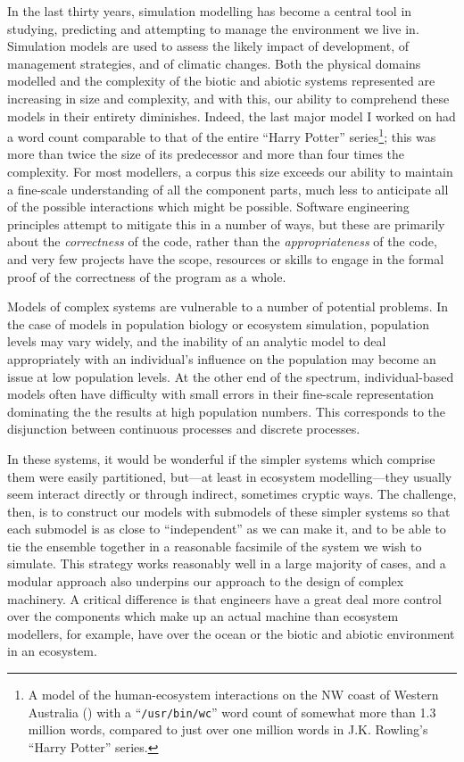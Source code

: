 In the last thirty years, simulation modelling has become a central
tool in studying, predicting and attempting to manage the environment
we live in. Simulation models are used to assess the likely impact of
development, of management strategies, and of climatic changes.  Both
the physical domains modelled and the complexity of the biotic and
abiotic systems represented are increasing in size and complexity, and
with this, our ability to comprehend these models in their entirety
diminishes. Indeed, the last major model I worked on had a word count
comparable to that of the entire ``Harry Potter'' series\footnote{A
model of the human-ecosystem interactions on the NW coast of Western
Australia (\cite{Gray2014}) with a ``\texttt{/usr/bin/wc}'' word count
of somewhat more than 1.3 million words, compared to just over one
million words in J.K. Rowling's ``Harry Potter'' series.}; this was
more than twice the size of its predecessor and more than four times
the complexity.  For most modellers, a corpus this size exceeds our
ability to maintain a fine-scale understanding of all the component
parts, much less to anticipate all of the possible interactions which
might be possible.  Software engineering principles attempt to
mitigate this in a number of ways, but these are primarily about the
\emph{correctness} of the code, rather than the \emph{appropriateness} of the code,
and very few projects have the scope, resources or skills to engage in
the formal proof of the correctness of the program as a whole.

Models of complex systems are vulnerable to a number of potential
problems. In the case of models in population biology or ecosystem
simulation, population levels may vary widely, and the inability of an
analytic model to deal appropriately with an individual's influence on
the population may become an issue at low population levels. At the
other end of the spectrum, individual-based models often have
difficulty with small errors in their fine-scale representation
dominating the the results at high population numbers.  This
corresponds to the disjunction between continuous processes and
discrete processes.

In these systems, it would be wonderful if the simpler systems which
comprise them were easily partitioned, but---at least in ecosystem
modelling---they usually seem interact directly or through indirect,
sometimes cryptic ways. The challenge, then, is to construct our
models with submodels of these simpler systems so that each submodel
is as close to ``independent'' as we can make it, and to be able to
tie the ensemble together in a reasonable facsimile of the system we
wish to simulate. This strategy works reasonably well in a large
majority of cases, and a modular approach also underpins our approach
to the design of complex machinery. A critical difference is that
engineers have a great deal more control over the components which
make up an actual machine than ecosystem modellers, for example, have
over the ocean or the biotic and abiotic environment in an ecosystem.

